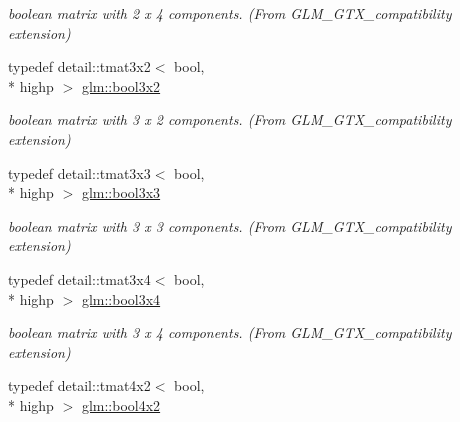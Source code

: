 \begin{DoxyCompactItemize}
\begin{DoxyCompactList}\small\item\em boolean matrix with 2 x 4 components. (From G\-L\-M\-\_\-\-G\-T\-X\-\_\-compatibility extension) \end{DoxyCompactList}\item 
\hypertarget{group__gtx__compatibility_gacf961fda4c64459911f552cbffdbffa8}{typedef detail\-::tmat3x2$<$ bool, \\*
highp $>$ \hyperlink{group__gtx__compatibility_gacf961fda4c64459911f552cbffdbffa8}{glm\-::bool3x2}}\label{group__gtx__compatibility_gacf961fda4c64459911f552cbffdbffa8}

\begin{DoxyCompactList}\small\item\em boolean matrix with 3 x 2 components. (From G\-L\-M\-\_\-\-G\-T\-X\-\_\-compatibility extension) \end{DoxyCompactList}\item 
\hypertarget{group__gtx__compatibility_gae9cc5d3d9c72543e303af4d702bf7b40}{typedef detail\-::tmat3x3$<$ bool, \\*
highp $>$ \hyperlink{group__gtx__compatibility_gae9cc5d3d9c72543e303af4d702bf7b40}{glm\-::bool3x3}}\label{group__gtx__compatibility_gae9cc5d3d9c72543e303af4d702bf7b40}

\begin{DoxyCompactList}\small\item\em boolean matrix with 3 x 3 components. (From G\-L\-M\-\_\-\-G\-T\-X\-\_\-compatibility extension) \end{DoxyCompactList}\item 
\hypertarget{group__gtx__compatibility_gaf68d62e1c790fa3f09ef5e866af690f1}{typedef detail\-::tmat3x4$<$ bool, \\*
highp $>$ \hyperlink{group__gtx__compatibility_gaf68d62e1c790fa3f09ef5e866af690f1}{glm\-::bool3x4}}\label{group__gtx__compatibility_gaf68d62e1c790fa3f09ef5e866af690f1}

\begin{DoxyCompactList}\small\item\em boolean matrix with 3 x 4 components. (From G\-L\-M\-\_\-\-G\-T\-X\-\_\-compatibility extension) \end{DoxyCompactList}\item 
\hypertarget{group__gtx__compatibility_gaa431c2e87e8d78c4780c938a9483d6ff}{typedef detail\-::tmat4x2$<$ bool, \\*
highp $>$ \hyperlink{group__gtx__compatibility_gaa431c2e87e8d78c4780c938a9483d6ff}{glm\-::bool4x2}}\label{group__gtx__compatibility_gaa431c2e87e8d78c4780c938a9483d6ff}


\end{DoxyCompactItemize}
